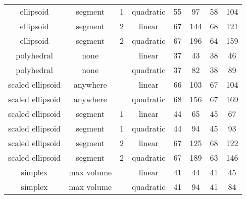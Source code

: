 \begin{center}
\begin{longtable}{ c c c c c c c c }
                ellipsoid &    segment &     1 &  quadratic &  55  &    97  &   58 &  104 \\
                ellipsoid &    segment &     2 &     linear &  67  &   144  &   68 &  121 \\
                ellipsoid &    segment &     2 &  quadratic &  67  &   196  &   64 &  159 \\
               polyhedral &       none &       &     linear &  37  &    43  &   38 &   46 \\
               polyhedral &       none &       &  quadratic &  37  &    82  &   38 &   89 \\
         scaled ellipsoid &   anywhere &       &     linear &  66  &   103  &   67 &  104 \\
         scaled ellipsoid &   anywhere &       &  quadratic &  68  &   156  &   67 &  169 \\
         scaled ellipsoid &    segment &     1 &     linear &  44  &    65  &   45 &   67 \\
         scaled ellipsoid &    segment &     1 &  quadratic &  44  &    94  &   45 &   93 \\
         scaled ellipsoid &    segment &     2 &     linear &  67  &   125  &   68 &  122 \\
         scaled ellipsoid &    segment &     2 &  quadratic &  67  &   189  &   63 &  146 \\
                  simplex & max volume &       &     linear &  41  &    44  &   41 &   45 \\
                  simplex & max volume &       &  quadratic &  41  &    94  &   41 &   84 \\


\end{longtable}
\end{center}
